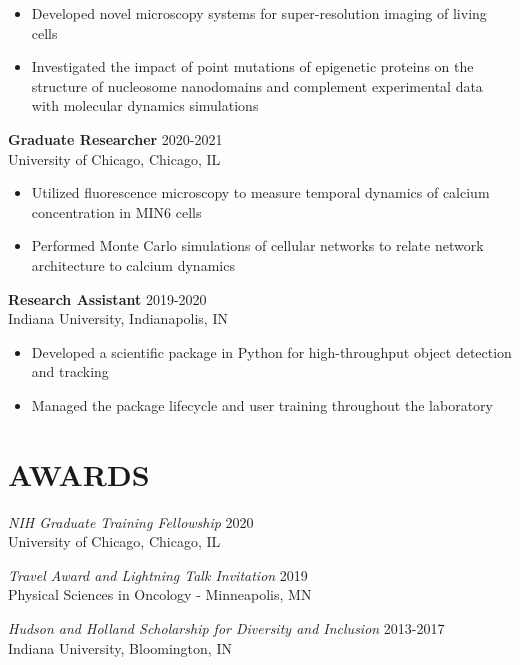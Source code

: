 \documentclass[margin, 10pt]{res} %
\begin{document}
\begin{resume}
\begin{itemize}
\item Developed novel microscopy systems for super-resolution imaging of living cells 

\item Investigated the impact of point mutations of epigenetic proteins on the structure of nucleosome nanodomains and complement experimental data with molecular dynamics simulations


\end{itemize}

\textbf{Graduate Researcher} \hfill 2020-2021 \\
University of Chicago, Chicago, IL

\begin{itemize} \itemsep -2pt %

\item Utilized fluorescence microscopy to measure temporal dynamics of calcium concentration in MIN6 cells

\item Performed Monte Carlo simulations of cellular networks to relate network architecture to calcium dynamics
 
\end{itemize}
 
\textbf{Research Assistant} \hfill 2019-2020\\
Indiana University, Indianapolis, IN
\begin{itemize} \itemsep -2pt

\item Developed a scientific package in Python for high-throughput object detection and tracking
\item Managed the package lifecycle and user training throughout the laboratory
\end{itemize}


\section{AWARDS}

{\sl NIH Graduate Training Fellowship} \hfill 2020 \\
University of Chicago, Chicago, IL

{\sl Travel Award and Lightning Talk Invitation} \hfill 2019 \\
Physical Sciences in Oncology - Minneapolis, MN

{\sl Hudson and Holland Scholarship for Diversity and Inclusion} \hfill 2013-2017 \\
Indiana University, Bloomington, IN 


\end{resume}
\end{document}
